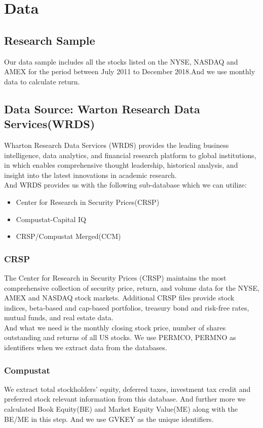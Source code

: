 \documentclass[12pt]{article}
\begin{document}
		
\section{Data}
\subsection{Research Sample}
\noindent Our data sample includes all the stocks listed on the NYSE, NASDAQ and AMEX for the period between July 2011 to December 2018.And we use monthly data to calculate return.
\subsection{Data Source: Warton Research Data Services(WRDS)}
Wharton Research Data Services (WRDS) provides the leading business intelligence, data analytics, and financial research platform to global institutions, in which enables comprehensive thought leadership, historical analysis, and insight into the latest innovations in academic research.\\
And WRDS provides us with the following sub-database which we can utilize:
\begin{itemize}
	\item Center for Research in Security Prices(CRSP)
	\item Compustat-Capital IQ
	\item CRSP/Compustat Merged(CCM)
\end{itemize}
\subsubsection{CRSP}
\noindent The Center for Research in Security Prices (CRSP) maintains the most comprehensive collection of security price, return, and volume data for the NYSE, AMEX and NASDAQ stock markets. Additional CRSP files provide stock indices, beta-based and cap-based portfolios, treasury bond and risk-free rates, mutual funds, and real estate data.\\

\noindent And what we need is the monthly closing stock price, number of shares outstanding and returns of all US stocks. We use PERMCO, PERMNO as identifiers when we extract data from the databases.
\subsubsection{Compustat}
\noindent We extract total stockholders' equity, deferred taxes, investment tax credit and preferred stock relevant information from this database. And further more we calculated Book Equity(BE) and Market Equity Value(ME) along with the BE/ME in this step. And we use GVKEY as the unique identifiers.
\end{document}
